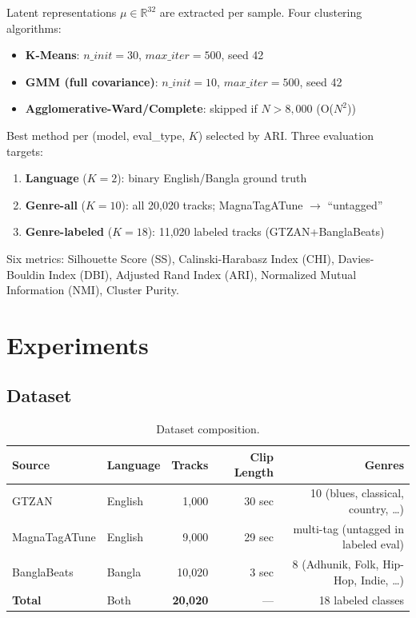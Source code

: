 \documentclass{article}
\begin{document}
Latent representations $\mu\!\in\!\mathbb{R}^{32}$ are extracted per sample.
Four clustering algorithms:
\begin{itemize}
    \item \textbf{K-Means}: $n\_init\!=\!30$, $max\_iter\!=\!500$, seed 42
    \item \textbf{GMM (full covariance)}: $n\_init\!=\!10$, $max\_iter\!=\!500$, seed 42
    \item \textbf{Agglomerative-Ward/Complete}: skipped if $N > 8{,}000$ (O($N^2$))
\end{itemize}
Best method per (model, eval\_type, $K$) selected by ARI. Three evaluation targets:
\begin{enumerate}
    \item \textbf{Language} ($K\!=\!2$): binary English/Bangla ground truth
    \item \textbf{Genre-all} ($K\!=\!10$): all 20,020 tracks; MagnaTagATune $\to$ ``untagged''
    \item \textbf{Genre-labeled} ($K\!=\!18$): 11,020 labeled tracks (GTZAN+BanglaBeats)
\end{enumerate}
Six metrics: Silhouette Score (SS), Calinski-Harabasz Index (CHI),
Davies-Bouldin Index (DBI), Adjusted Rand Index (ARI), Normalized Mutual Information (NMI),
Cluster Purity.

\section{Experiments}

\subsection{Dataset}

\begin{table}[H]
\centering
\caption{Dataset composition.}
\label{tab:dataset}
\small
\begin{tabular}{llrrr}
\toprule
\textbf{Source} & \textbf{Language} & \textbf{Tracks} & \textbf{Clip Length} & \textbf{Genres} \\
\midrule
GTZAN & English & 1,000 & 30 sec & 10 (blues, classical, country, \ldots) \\
MagnaTagATune & English & 9,000 & 29 sec & multi-tag (untagged in labeled eval) \\
BanglaBeats & Bangla & 10,020 & 3 sec & 8 (Adhunik, Folk, Hip-Hop, Indie, \ldots) \\
\midrule
\textbf{Total} & Both & \textbf{20,020} & --- & 18 labeled classes \\
\bottomrule
\end{tabular}
\end{table}
\end{document}

